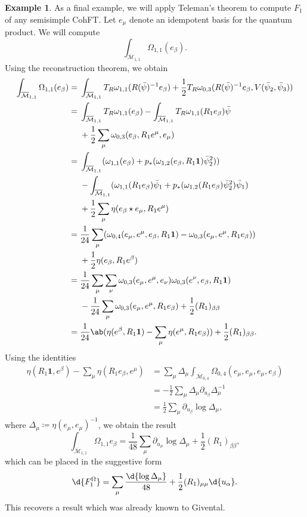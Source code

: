 \documentclass{amsart}
\theoremstyle{definition}
\newtheorem{exm}[thm]{Example}
\theoremstyle{remark}
\theoremstyle{plain}
\theoremstyle{definition}
\theoremstyle{remark}
\newcommand{\Mbar}{\overline{\mathcal{M}}}
\newcommand{\1}{\mathbf{1}}
\newcommand{\2}{\mathbf{2}}
\newcommand{\3}{\mathbf{3}}
\begin{document}
\begin{exm}
    As a final example, we will apply Teleman's theorem to compute $F_1$ of any semisimple CohFT. Let $e_{\mu}$ denote an idempotent basis for the quantum product. We will compute
    \[ \int_{\Mbar_{1,1}} \Omega_{1,1}(e_{\beta}). \]
    Using the reconstruction theorem, we obtain
    \begin{align*}
        \int_{\Mbar_{1,1}}\Omega_{1,1}(e_{\beta}) ={}& \int_{\Mbar_{1,1}} T_R \omega_{1,1}(R(\bar{\psi})^{-1} e_{\beta}) + \frac{1}{2} T_R \omega_{0,3}(R(\bar{\psi})^{-1} e_{\beta}, V(\bar{\psi}_2, \bar{\psi}_3)) \\
        ={}& \int_{\Mbar_{1,1}}T_R\omega_{1,1}(e_{\beta}) - \int_{\Mbar_{1,1}} T_R \omega_{1,1}(R_1 e_{\beta})\bar{\psi} \\ 
        &+ \frac{1}{2}\sum_{\mu}  \omega_{0,3}(e_{\beta}, R_1 e^{\mu}, e_{\mu}) \\
        ={}& \int_{\Mbar_{1,1}} ( \omega_{1,1}(e_{\beta}) + p_* ( \omega_{1,2}(e_{\beta}, R_1 \1) \bar{\psi}_2^2 )) \\
        &- \int_{\Mbar_{1,1}} (\omega_{1,1}(R_1 e_{\beta})\bar{\psi}_1 + p_* ( \omega_{1,2}(R_1 e_{\beta}) \bar{\psi}_2^2 ) \bar{\psi}_1) \\
        &+ \frac{1}{2} \sum_{\mu} \eta(e_{\beta} \star e_{\mu}, R_1 e^{\mu}) \\
        ={}& \frac{1}{24} \sum_{\mu} ( \omega_{0,4}(e_{\mu}, e^{\mu}, e_{\beta}, R_1 \1) -\omega_{0,3}(e_{\mu}, e^{\mu}, R_1 e_{\beta}) )\\
        &+ \frac{1}{2} \eta(e_{\beta}, R_1 e^{\beta}) \\
        ={}& \frac{1}{24} \sum_{\mu}\sum_{\nu} \omega_{0,3}(e_{\mu}, e^{\mu}, e_{\nu})\omega_{0,3}(e^{\nu}, e_{\beta}, R_1 \1) \\
        &-\frac{1}{24} \sum_{\mu} \omega_{0,3}(e_{\mu}, e^{\mu}, R_1 e_{\beta}) + \frac{1}{2} (R_1)_{\beta\beta} \\
        ={}& \frac{1}{24} \ab(\eta(e^{\beta}, R_1 \1) - \sum_{\mu} \eta(e^{\mu}, R_1 e_{\beta})) + \frac{1}{2} (R_1)_{\beta\beta}.
    \end{align*}
    Using the identities
    \begin{align*}
        \eta(R_1 \1, e^{\beta}) - \sum_{\mu} \eta(R_1 e_{\beta}, e^{\mu}) &= \sum_{\mu} \Delta_{\mu} \int_{\Mbar_{0,4}} \Omega_{0,4}(e_{\mu}, e_{\mu}, e_{\mu}, e_{\beta}) \\
        &= -\frac{1}{2}\sum_{\mu} \Delta_{\mu} \partial_{u_{\beta}} \Delta_{\mu}^{-1} \\
        &= \frac{1}{2} \sum_{\mu} \partial_{u_{\beta}} \log \Delta_{\mu},
    \end{align*}
    where $\Delta_{\mu} \coloneqq \eta(e_{\mu}, e_{\mu})^{-1}$, we obtain the result
    \[ \int_{\Mbar_{1,1}} \Omega_{1,1} e_{\beta} = \frac{1}{48} \sum_{\mu} \partial_{u_{\mu}} \log \Delta_{\mu} + \frac{1}{2} (R_1)_{\beta\beta}, \]
    which can be placed in the suggestive form
    \[ \d{F_1^{\Omega}} = \sum_{\mu} \frac{\d{\log \Delta_{\mu}}}{48} + \frac{1}{2} (R_1)_{\mu\mu} \d{u_{\alpha}}. \]
    This recovers a result which was already known to Givental.
\end{exm}
\end{document}

